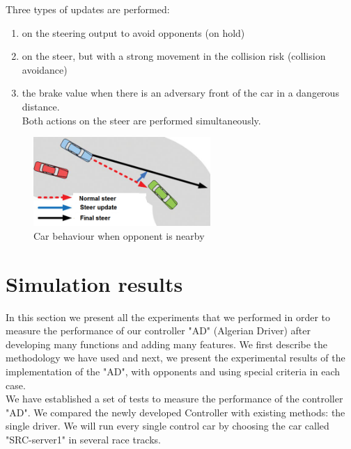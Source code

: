 \documentclass{llncs}
\begin{document}
Three types of updates are performed:
\begin{enumerate}
	
	\item on the steering output to avoid opponents (on hold)
	\item on the steer, but with a strong movement in the collision risk  (collision avoidance)
	\item the brake value when there is an adversary
	front of the car in a dangerous distance. \\
	Both actions on the steer are performed simultaneously.
	
\end{enumerate}
\begin{figure}[h!]
	
	\centering
	\includegraphics[width=0.6\textwidth]{fig/op.png}
	\begin{minipage}{10cm}
		\centering
		\caption{\footnotesize Car behaviour when opponent is nearby} 
		\label{fig42}
	\end{minipage} 
	
\end{figure}

\section{Simulation results}

In this section we present all the experiments that we performed in order to measure the performance of our controller "AD" (Algerian Driver) after developing many functions and adding many features.
We first describe the methodology we have used and next, we present the experimental results of the implementation of the "AD", with opponents and
using special criteria in each case. \\


We have established a set of tests to measure the performance of the controller "AD". We compared the newly developed Controller with existing methods: the single driver. We will run every single control car by choosing the car called "SRC-server1" in several race tracks. \\
\end{document}
